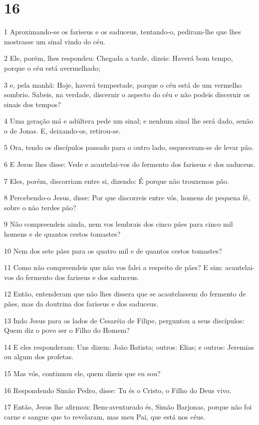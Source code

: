 \chapter{16}

\par 1 Aproximando-se os fariseus e os saduceus, tentando-o, pediram-lhe que lhes mostrasse um sinal vindo do céu.
\par 2 Ele, porém, lhes respondeu: Chegada a tarde, dizeis: Haverá bom tempo, porque o céu está avermelhado;
\par 3 e, pela manhã: Hoje, haverá tempestade, porque o céu está de um vermelho sombrio. Sabeis, na verdade, discernir o aspecto do céu e não podeis discernir os sinais dos tempos?
\par 4 Uma geração má e adúltera pede um sinal; e nenhum sinal lhe será dado, senão o de Jonas. E, deixando-os, retirou-se.
\par 5 Ora, tendo os discípulos passado para o outro lado, esqueceram-se de levar pão.
\par 6 E Jesus lhes disse: Vede e acautelai-vos do fermento dos fariseus e dos saduceus.
\par 7 Eles, porém, discorriam entre si, dizendo: É porque não trouxemos pão.
\par 8 Percebendo-o Jesus, disse: Por que discorreis entre vós, homens de pequena fé, sobre o não terdes pão?
\par 9 Não compreendeis ainda, nem vos lembrais dos cinco pães para cinco mil homens e de quantos cestos tomastes?
\par 10 Nem dos sete pães para os quatro mil e de quantos cestos tomastes?
\par 11 Como não compreendeis que não vos falei a respeito de pães? E sim: acautelai-vos do fermento dos fariseus e dos saduceus.
\par 12 Então, entenderam que não lhes dissera que se acautelassem do fermento de pães, mas da doutrina dos fariseus e dos saduceus.
\par 13 Indo Jesus para os lados de Cesaréia de Filipe, perguntou a seus discípulos: Quem diz o povo ser o Filho do Homem?
\par 14 E eles responderam: Uns dizem: João Batista; outros: Elias; e outros: Jeremias ou algum dos profetas.
\par 15 Mas vós, continuou ele, quem dizeis que eu sou?
\par 16 Respondendo Simão Pedro, disse: Tu és o Cristo, o Filho do Deus vivo.
\par 17 Então, Jesus lhe afirmou: Bem-aventurado és, Simão Barjonas, porque não foi carne e sangue que to revelaram, mas meu Pai, que está nos céus.
